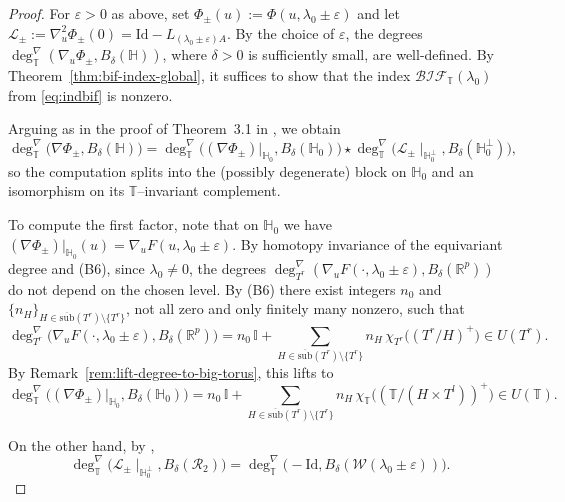 \documentclass[reqno,twoside,12pt]{amsart}
\newcommand{\bH}{\mathbb{H}}
\newcommand{\bI}{\mathbb{I}}
\newcommand{\bT}{\mathbb{T}}
\newcommand{\cL}{\mathcal{L}}
\newcommand{\cR}{\mathcal{R}}
\newcommand{\cW}{\mathcal{W}}
\numberwithin{equation}{section} \errorcontextlines=0
\newcommand{\sub}{\overline{\mathrm{sub}}}
\newcommand{\bif}{\mathcal{BIF}}
\begin{document}
\begin{proof}
For $\varepsilon>0$ as above, set $\Phi_{\pm}(u):=\Phi(u,\lambda_{0}\pm\varepsilon)$ and let
$\cL_{\pm}:=\nabla^{2}_{u}\Phi_{\pm}(0)=\mathrm{Id}-L_{(\lambda_{0}\pm\varepsilon)A}$.
By the choice of $\varepsilon$, the degrees $\deg^{\nabla}_{\bT}(\nabla_{u}\Phi_{\pm},B_{\delta}(\bH))$, where $\delta>0$ is sufficiently small, are well-defined.
By Theorem~\ref{thm:bif-index-global}, it suffices to show that the index $\bif_{\bT}(\lambda_{0})$ from \eqref{eq:indbif} is nonzero.

Arguing as in the proof of Theorem~3.1 in \cite{GolRybSte2025}, we obtain
\begin{equation}\label{eq:splitted}
\deg^{\nabla}_{\bT}\bigl(\nabla\Phi_{\pm},B_{\delta}(\bH)\bigr)
=
\deg^{\nabla}_{\bT}\bigl((\nabla\Phi_{\pm})|_{\bH_{0}}, B_{\delta}(\bH_{0})\bigr)
\star
\deg^{\nabla}_{\bT}\bigl(\cL_{\pm}\!\mid_{\bH_{0}^{\perp}},B_{\delta}(\bH_{0}^{\perp})\bigr),
\end{equation}
so the computation splits into the (possibly degenerate) block on $\bH_{0}$ and an isomorphism on its $\bT$–invariant complement.

To compute the first factor, note that on $\bH_{0}$  we have
$
(\nabla\Phi_{\pm})|_{\bH_{0}}(u)=\nabla_{u}F(u,\lambda_{0}\pm\varepsilon).
$
By homotopy invariance of the equivariant degree and (B6), since $\lambda_{0}\neq 0$, the degrees
$\deg^{\nabla}_{T^{r}}(\nabla_{u}F(\cdot,\lambda_{0}\pm\varepsilon), B_{\delta}(\mathbb{R}^{p}))$
do not depend on the chosen level. By (B6) there exist integers $n_{0}$ and $\{n_{H}\}_{H\in\sub(T^{r})\setminus\{T^{r}\}}$, not all zero and only finitely many nonzero, such that
\[
\deg^{\nabla}_{T^{r}}\bigl(\nabla_{u}F(\cdot,\lambda_{0}\pm\varepsilon), B_{\delta}(\mathbb{R}^{p})\bigr)
=
n_{0}\,\bI+
\sum_{H\in\sub(T^{r})\setminus\{T^{r}\}} n_{H}\,\chi_{T^{r}}\bigl((T^{r}/H)^{+}\bigr)\in U(T^{r}).
\]
By Remark~\ref{rem:lift-degree-to-big-torus}, this lifts to
\[
\deg^{\nabla}_{\bT}\bigl((\nabla\Phi_{\pm})|_{\bH_{0}}, B_{\delta}(\bH_{0})\bigr)
=
n_{0}\,\bI+
\sum_{H\in\sub(T^{r})\setminus\{T^{r}\}} n_{H}\,\chi_{\bT}\bigl((\bT/(H\times T^{l}))^{+}\bigr)\in U(\bT).
\]

On the other hand, by \cite[Thm.~4.7]{Ryb2005milano},
\[
\deg^{\nabla}_{\bT}\bigl(\cL_{\pm}\mid_{\bH_{0}^{\perp}},B_{\delta}(\cR_{2})\bigr)
=\deg^{\nabla}_{\bT}\bigl(-\mathrm{Id},B_{\delta}(\cW(\lambda_{0}\pm\varepsilon))\bigr).
\]


\end{proof}
\end{document}
